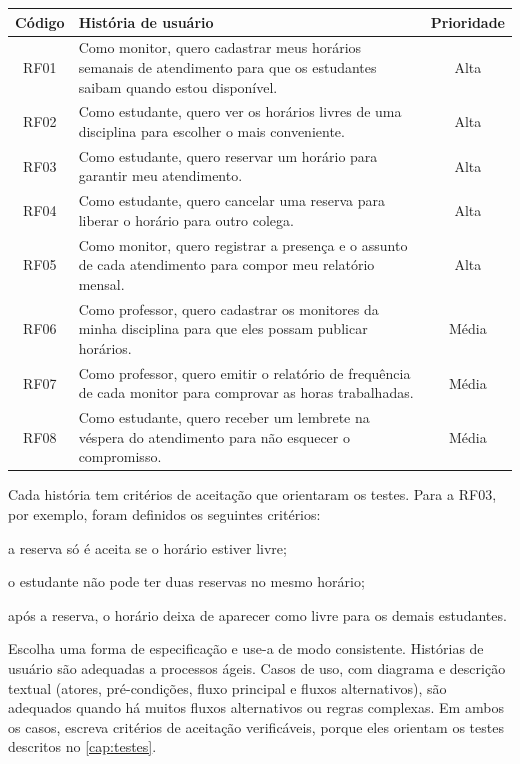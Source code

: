 \begin{quadro}[htbp]
  \centering
  \caption{Histórias de usuário do Monitora}
  \label{qua:historias}
  \small
  \begin{tabularx}{\textwidth}{|c|X|c|}
    \hline
    \textbf{Código} & \textbf{História de usuário} & \textbf{Prioridade} \\
    \hline
    RF01 & Como monitor, quero cadastrar meus horários semanais de atendimento
      para que os estudantes saibam quando estou disponível. & Alta \\
    \hline
    RF02 & Como estudante, quero ver os horários livres de uma disciplina para
      escolher o mais conveniente. & Alta \\
    \hline
    RF03 & Como estudante, quero reservar um horário para garantir meu
      atendimento. & Alta \\
    \hline
    RF04 & Como estudante, quero cancelar uma reserva para liberar o horário
      para outro colega. & Alta \\
    \hline
    RF05 & Como monitor, quero registrar a presença e o assunto de cada
      atendimento para compor meu relatório mensal. & Alta \\
    \hline
    RF06 & Como professor, quero cadastrar os monitores da minha disciplina para
      que eles possam publicar horários. & Média \\
    \hline
    RF07 & Como professor, quero emitir o relatório de frequência de cada
      monitor para comprovar as horas trabalhadas. & Média \\
    \hline
    RF08 & Como estudante, quero receber um lembrete na véspera do atendimento
      para não esquecer o compromisso. & Média \\
    \hline
  \end{tabularx}
  \fonteautor
\end{quadro}

Cada história tem critérios de aceitação que orientaram os testes. Para a
RF03, por exemplo, foram definidos os seguintes critérios:
\begin{alineas}
  \item a reserva só é aceita se o horário estiver livre;
  \item o estudante não pode ter duas reservas no mesmo horário;
  \item após a reserva, o horário deixa de aparecer como livre para os demais
        estudantes.
\end{alineas}

\begin{instrucao}
Escolha uma forma de especificação e use-a de modo consistente. Histórias de
usuário são adequadas a processos ágeis. Casos de uso, com diagrama e
descrição textual (atores, pré-condições, fluxo principal e fluxos
alternativos), são adequados quando há muitos fluxos alternativos ou regras
complexas. Em ambos os casos, escreva critérios de aceitação verificáveis,
porque eles orientam os testes descritos no \cref{cap:testes}.
\end{instrucao}


